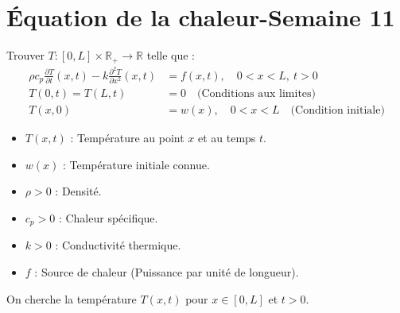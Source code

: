 \section{Équation de la chaleur-Semaine 11}

\begin{definition}
Trouver $T : [0, L] \times \mathbb{R}_+ \to \mathbb{R}$ telle que :
\begin{align}
    \rho c_p \frac{\partial T}{\partial t}(x,t) - k \frac{\partial^2 T}{\partial x^2}(x,t) &= f(x,t), \quad 0 < x < L, \ t > 0 \\
    T(0,t) = T(L,t) &= 0 \quad \text{(Conditions aux limites)} \label{eq:cl} \\
    T(x,0) &= w(x), \quad 0 < x < L \quad \text{(Condition initiale)} \label{eq:ci}
\end{align}
\end{definition}

\begin{center}
\end{center}

\begin{explication}
\begin{itemize}
    \item $T(x,t)$ : Température au point $x$ et au temps $t$.
    \item $w(x)$ : Température initiale connue.
    \item $\rho > 0$ : Densité.
    \item $c_p > 0$ : Chaleur spécifique.
    \item $k > 0$ : Conductivité thermique.
    \item $f$ : Source de chaleur (Puissance par unité de longueur).
\end{itemize}
On cherche la température $T(x,t)$ pour $x \in [0,L]$ et $t > 0$.
\end{explication}


